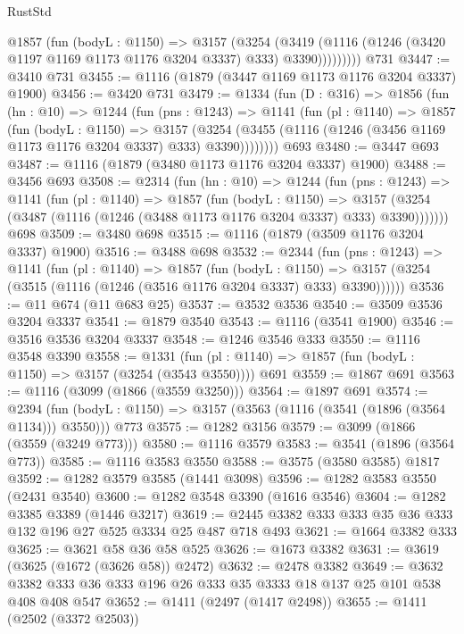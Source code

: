 \begin{lexlean}{RustStd}
\begin{coremodule}
{\begin{coremodule}
{{{{{{{{{{{            @1857
              (fun (bodyL : @1150) =>
              @3157
                (@3254
                  (@3419
                    (@1116 (@1246 (@3420 @1197 @1169 @1173 @1176 @3204 @3337) @333) @3390)))))))))
    @731
@3447 := @3410 @731
@3455 := @1116 (@1879 (@3447 @1169 @1173 @1176 @3204 @3337) @1900)
@3456 := @3420 @731
@3479 := @1334
    (fun (D : @316) =>
    @1856
      (fun (hn : @10) =>
      @1244
        (fun (pns : @1243) =>
        @1141
          (fun (pl : @1140) =>
          @1857
            (fun (bodyL : @1150) =>
            @3157
              (@3254 (@3455 (@1116 (@1246 (@3456 @1169 @1173 @1176 @3204 @3337) @333) @3390))))))))
    @693
@3480 := @3447 @693
@3487 := @1116 (@1879 (@3480 @1173 @1176 @3204 @3337) @1900)
@3488 := @3456 @693
@3508 := @2314
    (fun (hn : @10) =>
    @1244
      (fun (pns : @1243) =>
      @1141
        (fun (pl : @1140) =>
        @1857
          (fun (bodyL : @1150) =>
          @3157 (@3254 (@3487 (@1116 (@1246 (@3488 @1173 @1176 @3204 @3337) @333) @3390)))))))
    @698
@3509 := @3480 @698
@3515 := @1116 (@1879 (@3509 @1176 @3204 @3337) @1900)
@3516 := @3488 @698
@3532 := @2344
    (fun (pns : @1243) =>
    @1141
      (fun (pl : @1140) =>
      @1857
        (fun (bodyL : @1150) =>
        @3157 (@3254 (@3515 (@1116 (@1246 (@3516 @1176 @3204 @3337) @333) @3390))))))
@3536 := @11 @674 (@11 @683 @25)
@3537 := @3532 @3536
@3540 := @3509 @3536 @3204 @3337
@3541 := @1879 @3540
@3543 := @1116 (@3541 @1900)
@3546 := @3516 @3536 @3204 @3337
@3548 := @1246 @3546 @333
@3550 := @1116 @3548 @3390
@3558 := @1331 (fun (pl : @1140) => @1857 (fun (bodyL : @1150) => @3157 (@3254 (@3543 @3550)))) @691
@3559 := @1867 @691
@3563 := @1116 (@3099 (@1866 (@3559 @3250)))
@3564 := @1897 @691
@3574 := @2394
    (fun (bodyL : @1150) => @3157 (@3563 (@1116 (@3541 (@1896 (@3564 @1134))) @3550)))
    @773
@3575 := @1282 @3156
@3579 := @3099 (@1866 (@3559 (@3249 @773)))
@3580 := @1116 @3579
@3583 := @3541 (@1896 (@3564 @773))
@3585 := @1116 @3583 @3550
@3588 := @3575 (@3580 @3585) @1817
@3592 := @1282 @3579 @3585 (@1441 @3098)
@3596 := @1282 @3583 @3550 (@2431 @3540)
@3600 := @1282 @3548 @3390 (@1616 @3546)
@3604 := @1282 @3385 @3389 (@1446 @3217)
@3619 := @2445 @3382 @333 @333 @35 @36 @333 @132 @196 @27 @525 @3334 @25 @487 @718 @493
@3621 := @1664 @3382 @333
@3625 := @3621 @58 @36 @58 @525
@3626 := @1673 @3382
@3631 := @3619 (@3625 (@1672 (@3626 @58)) @2472)
@3632 := @2478 @3382
@3649 := @3632 @3382 @333 @36 @333 @196 @26 @333 @35 @3333 @18 @137 @25 @101 @538 @408 @408 @547
@3652 := @1411 (@2497 (@1417 @2498))
@3655 := @1411 (@2502 (@3372 @2503))
}}}}}}}}}}}
\end{coremodule}}
\end{coremodule}
\end{lexlean}
